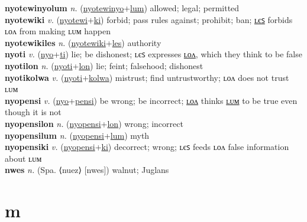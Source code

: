 \textbf{nyotewinyolum} \textit{n.} (\hyperref[nyotewinyo]{nyotewinyo}+\hyperref[lum]{lum})
allowed; legal; permitted \label{nyotewinyolum} \\
\textbf{nyotewiki} \textit{v.} (\hyperref[nyotewi]{nyotewi}+\hyperref[ki]{ki})
forbid; pass rules against; prohibit; ban; \hyperref[nyotewikiles]{ʟєꜱ} forbids ʟᴏᴧ from making ʟᴜᴍ happen \label{nyotewiki} \\
\textbf{nyotewikiles} \textit{n.} (\hyperref[nyotewiki]{nyotewiki}+\hyperref[les]{les})
authority \label{nyotewikiles} \\
\textbf{nyoti} \textit{v.} (\hyperref[nyo]{nyo}+\hyperref[ti]{ti})
lie; be dishonest; ʟєꜱ expresses \hyperref[nyotilon]{ʟᴏᴧ}, which they think to be false \label{nyoti} \\
\textbf{nyotilon} \textit{n.} (\hyperref[nyoti]{nyoti}+\hyperref[lon]{lon})
lie; feint; falsehood; dishonest \label{nyotilon} \\
\textbf{nyotikolwa} \textit{v.} (\hyperref[nyoti]{nyoti}+\hyperref[kolwa]{kolwa})
mistrust; find untrustworthy; ʟᴏᴧ does not trust ʟᴜᴍ \label{nyotikolwa} \\
\textbf{nyopensi} \textit{v.} (\hyperref[nyo]{nyo}+\hyperref[pensi]{pensi})
be wrong; be incorrect; \hyperref[nyopensilon]{ʟᴏᴧ} thinks \hyperref[nyopensilum]{ʟᴜᴍ} to be true even though it is not \label{nyopensi} \\
\textbf{nyopensilon} \textit{n.} (\hyperref[nyopensi]{nyopensi}+\hyperref[lon]{lon})
wrong; incorrect \label{nyopensilon} \\
\textbf{nyopensilum} \textit{n.} (\hyperref[nyopensi]{nyopensi}+\hyperref[lum]{lum})
myth \label{nyopensilum} \\
\textbf{nyopensiki} \textit{v.} (\hyperref[nyopensi]{nyopensi}+\hyperref[ki]{ki})
decorrect; wrong; ʟєꜱ feeds ʟᴏᴧ false information about ʟᴜᴍ \label{nyopensiki} \\
\textbf{nwes} \textit{n.} (Spa. ⟨nuez⟩ [nwes])
walnut; Juglans \label{nwes} 

\section{m}

